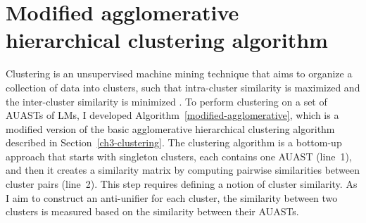 \section{Modified agglomerative hierarchical clustering algorithm} \label{m-clustering-alg}
Clustering is an unsupervised machine mining technique that aims to organize a collection of data into clusters, such that intra-cluster similarity is maximized and the inter-cluster similarity is minimized \cite{karypis1999chameleon,grira2004unsupervised}.
To perform clustering on a set of AUASTs of LMs, I developed Algorithm~\ref{modified-agglomerative}, which is a modified version of the basic agglomerative hierarchical clustering algorithm described in Section~\ref{ch3-clustering}. The clustering algorithm is a bottom-up approach that starts with singleton clusters, each contains one AUAST (line~1), and then it creates a similarity matrix by computing pairwise similarities between cluster pairs (line~2). This step requires defining a notion of cluster similarity. As I aim to construct an anti-unifier for each cluster, the similarity between two clusters is measured based on the similarity between their AUASTs.



